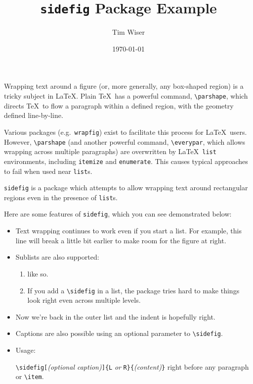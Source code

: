 \documentclass{article}
\begin{document}
	
	\title{\texttt{sidefig} Package Example}
	\author{Tim Wiser}
	\date{\today}
	
	\maketitle
	
	\newsavebox\samplebox
	
	\noindent Wrapping text around a figure (or, more generally, any box-shaped region) is a tricky subject in \LaTeX.
	Plain \TeX\ has a powerful command, \verb|\parshape|, which directs \TeX\ to flow a paragraph within a defined region, with the geometry defined line-by-line.
	
	Various packages (e.g.~\texttt{wrapfig}) exist to facilitate this process for \LaTeX\ users.
	However, \verb|\parshape| (and another powerful command, \verb|\everypar|, which allows wrapping across multiple paragraphs) are overwritten by \LaTeX\ \verb|list| environments, including \verb|itemize| and \verb|enumerate|.
	This causes typical approaches to fail when used near \verb|list|s.
	
	\texttt{sidefig} is a package which attempts to allow wrapping text around rectangular regions even in the presence of \texttt{list}s.
	
	Here are some features of \texttt{sidefig}, which you can see demonstrated below:
	\begin{itemize}
	
		\item Text wrapping continues to work even if you start a list.
		For example, this line will break a little bit earlier to make room for the figure at right.
		
		\item Sublists are also supported:
		
		\begin{enumerate}
			\item like so.
			
			
			\item If you add a \verb|\sidefig| in a list, the package tries hard to make things look right even across multiple levels.
		\end{enumerate}
		
		\item Now we're back in the outer list and the indent is hopefully right.
		
		\item Captions are also possible using an optional parameter to \verb|\sidefig|.
		
		\item Usage:
		
		\verb|\sidefig[|\emph{(optional caption)}\verb|]{L|\emph{ or }\verb|R}{|\emph{(content)}\verb|}| right before any paragraph or \verb|\item|.
	\end{itemize}
	
\end{document}

